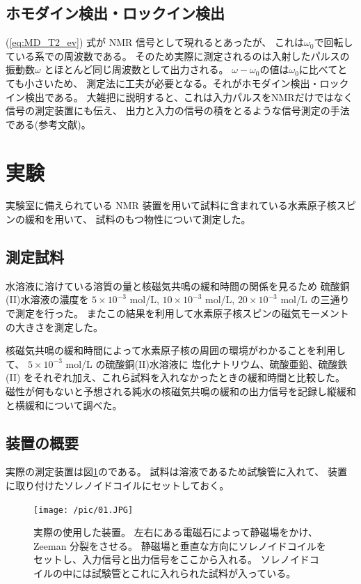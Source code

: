 \documentclass[11pt,dvipdfmx,a4paper]{jsarticle}
\begin{document}
\subsection{ホモダイン検出・ロックイン検出}
(\ref{eq:MD_T2_ev}) 式が NMR 信号として現れるとあったが、
これは\(\omega_0\)で回転している系での周波数である。
そのため実際に測定されるのは入射したパルスの振動数\(\omega\)
とほとんど同じ周波数として出力される。
\(\omega-\omega_0\)の値は\(\omega_0\)に比べてとても小さいため、
測定法に工夫が必要となる。それがホモダイン検出・ロックイン検出である。
大雑把に説明すると、これは入力パルスをNMRだけではなく信号の測定装置にも伝え、
出力と入力の信号の積をとるような信号測定の手法である(参考文献\cite{Morita_2010})。


\section{実験}
実験室に備えられている NMR 装置を用いて試料に含まれている水素原子核スピンの緩和を用いて、
試料のもつ物性について測定した。
\subsection{測定試料}
水溶液に溶けている溶質の量と核磁気共鳴の緩和時間の関係を見るため
硫酸銅(II)水溶液の濃度を
\(5\times 10^{-3}\) mol/L,
\(10\times 10^{-3}\) mol/L,
\(20\times 10^{-3}\) mol/L
の三通りで測定を行った。
またこの結果を利用して水素原子核スピンの磁気モーメントの大きさを測定した。

核磁気共鳴の緩和時間によって水素原子核の周囲の環境がわかることを利用して、
\(5\times 10^{-3}\) mol/L の硫酸銅(II)水溶液に
塩化ナトリウム、硫酸亜鉛、硫酸鉄(II)
をそれぞれ加え、これら試料を入れなかったときの緩和時間と比較した。
磁性が何もないと予想される純水の核磁気共鳴の緩和の出力信号を記録し縦緩和と横緩和について調べた。

\subsection{装置の概要}
実際の測定装置は図\ref{pic:machine}のである。
試料は溶液であるため試験管に入れて、
装置に取り付けたソレノイドコイルにセットしておく。
\begin{figure}[H]
	\centering
	\texttt{[image: /pic/01.JPG]}
	\caption{実際の使用した装置。
	左右にある電磁石によって静磁場をかけ、Zeeman 分裂をさせる。
	静磁場と垂直な方向にソレノイドコイルをセットし、入力信号と出力信号をここから入れる。
	ソレノイドコイルの中には試験管とこれに入れられた試料が入っている。}
	\label{pic:machine}
\end{figure}
\end{document}
